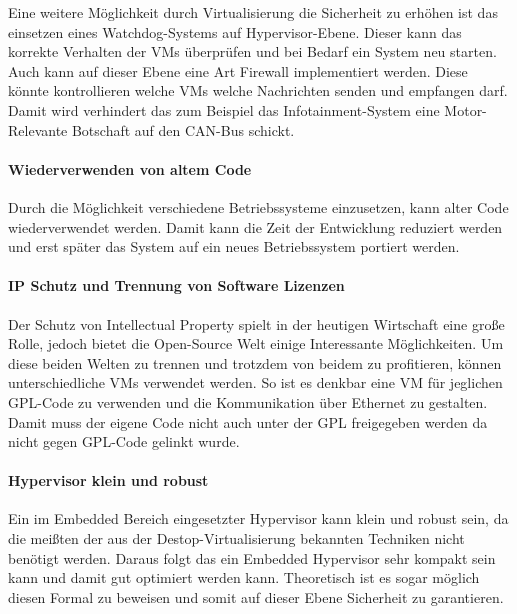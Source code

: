 \documentclass[
  a4paper,					    %
  twoside,
  DIV=calc,     				%
  bibliography=totoc,
  cleardoublepage=empty,
  ngerman,     					%
  final       					%
]{scrbook}
\begin{document}
Eine weitere Möglichkeit durch Virtualisierung die Sicherheit zu erhöhen ist das einsetzen eines Watchdog-Systems auf Hypervisor-Ebene. Dieser kann das korrekte Verhalten der VMs überprüfen und bei Bedarf ein System neu starten. Auch kann auf dieser Ebene eine Art Firewall implementiert werden. Diese könnte kontrollieren welche VMs welche Nachrichten senden und empfangen darf. Damit wird verhindert das zum Beispiel das Infotainment-System eine Motor-Relevante Botschaft auf den CAN-Bus schickt.

\paragraph{Wiederverwenden von altem Code}
Durch die Möglichkeit verschiedene Betriebssysteme einzusetzen, kann alter Code wiederverwendet werden. Damit kann die Zeit der Entwicklung reduziert werden und erst später das System auf ein neues Betriebssystem portiert werden.

\paragraph{IP Schutz und Trennung von Software Lizenzen}
Der Schutz von Intellectual Property spielt in der heutigen Wirtschaft eine große Rolle, jedoch bietet die Open-Source Welt einige Interessante Möglichkeiten. Um diese beiden Welten zu trennen und trotzdem von beidem zu profitieren, können unterschiedliche VMs verwendet werden. So ist es denkbar eine VM für jeglichen GPL-Code zu verwenden und die Kommunikation über Ethernet zu gestalten. Damit muss der eigene Code nicht auch unter der GPL freigegeben werden da nicht gegen GPL-Code gelinkt wurde.


\paragraph{Hypervisor klein und robust}
Ein im Embedded Bereich eingesetzter Hypervisor kann klein und robust sein, da die meißten der aus der Destop-Virtualisierung bekannten Techniken nicht benötigt werden. Daraus folgt das ein Embedded Hypervisor sehr kompakt sein kann und damit gut optimiert werden kann. Theoretisch ist es sogar möglich diesen Formal zu beweisen und somit auf dieser Ebene Sicherheit zu garantieren.
\end{document}
